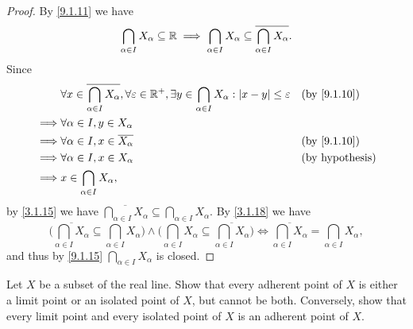 \begin{proof}
  By \cref{9.1.11} we have
  \[
    \bigcap_{\alpha \in I} X_{\alpha} \subseteq \mathbb{R} \implies \bigcap_{\alpha \in I} X_{\alpha} \subseteq \overline{\bigcap_{\alpha \in I} X_{\alpha}}.
  \]
  Since
  \begin{align*}
             & \forall x \in \overline{\bigcap_{\alpha \in I} X_{\alpha}}, \forall \varepsilon \in \R^+, \exists y \in \bigcap_{\alpha \in I} X_{\alpha} : \abs{x - y} \leq \varepsilon &  & \by{9.1.10}            \\
    \implies & \forall \alpha \in I, y \in X_{\alpha}                                                                                                                                                               \\
    \implies & \forall \alpha \in I, x \in \overline{X_{\alpha}}                                                                                                                        &  & \by{9.1.10}            \\
    \implies & \forall \alpha \in I, x \in X_{\alpha}                                                                                                                                   &  & \text{(by hypothesis)} \\
    \implies & x \in \bigcap_{\alpha \in I} X_{\alpha},
  \end{align*}
  by \cref{3.1.15} we have \(\overline{\bigcap_{\alpha \in I} X_{\alpha}} \subseteq \bigcap_{\alpha \in I} X_{\alpha}\).
  By \cref{3.1.18} we have
  \[
    \bigg(\overline{\bigcap_{\alpha \in I} X_{\alpha}} \subseteq \bigcap_{\alpha \in I} X_{\alpha}\bigg) \land \bigg(\bigcap_{\alpha \in I} X_{\alpha} \subseteq \overline{\bigcap_{\alpha \in I} X_{\alpha}}\bigg) \iff \overline{\bigcap_{\alpha \in I} X_{\alpha}} = \bigcap_{\alpha \in I} X_{\alpha},
  \]
  and thus by \cref{9.1.15} \(\bigcap_{\alpha \in I} X_{\alpha}\) is closed.
\end{proof}

\begin{ex}\label{ex:9.1.9}
  Let \(X\) be a subset of the real line.
  Show that every adherent point of \(X\) is either a limit point or an isolated point of \(X\), but cannot be both.
  Conversely, show that every limit point and every isolated point of \(X\) is an adherent point of \(X\).
\end{ex}

